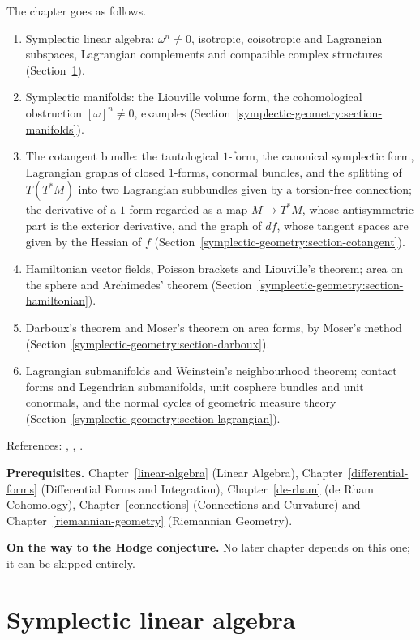 The chapter goes as follows.
\begin{enumerate}
\item Symplectic linear algebra: $\omega^n \neq 0$, isotropic, coisotropic and Lagrangian subspaces, Lagrangian complements and compatible complex structures
(Section~\ref{symplectic-geometry:section-linear}).
\item Symplectic manifolds: the Liouville volume form, the cohomological obstruction $[\omega]^n \neq 0$, examples (Section~\ref{symplectic-geometry:section-manifolds}).
\item The cotangent bundle: the tautological $1$-form, the canonical symplectic form, Lagrangian graphs of closed $1$-forms, conormal bundles, and the splitting of $T(T^*M)$ into two Lagrangian
subbundles given by a torsion-free connection; the derivative of a $1$-form regarded as a map $M \to T^*M$, whose antisymmetric part is the exterior derivative, and the graph of $df$, whose
tangent spaces are given by the Hessian of $f$ (Section~\ref{symplectic-geometry:section-cotangent}).
\item Hamiltonian vector fields, Poisson brackets and Liouville's theorem; area on the sphere and Archimedes' theorem (Section~\ref{symplectic-geometry:section-hamiltonian}).
\item Darboux's theorem and Moser's theorem on area forms, by Moser's method (Section~\ref{symplectic-geometry:section-darboux}).
\item Lagrangian submanifolds and Weinstein's neighbourhood theorem; contact forms and Legendrian submanifolds, unit cosphere bundles and unit conormals, and the normal cycles
of geometric measure theory (Section~\ref{symplectic-geometry:section-lagrangian}).
\end{enumerate}
References: \cite{cannas-da-silva}, \cite{mcduff-salamon}, \cite[Chapter 22]{lee-smooth-manifolds}.

\noindent\textbf{Prerequisites.} Chapter~\ref{linear-algebra} (Linear Algebra), Chapter~\ref{differential-forms} (Differential Forms and Integration), Chapter~\ref{de-rham} (de Rham Cohomology),
Chapter~\ref{connections} (Connections and Curvature) and Chapter~\ref{riemannian-geometry} (Riemannian Geometry).

\noindent\textbf{On the way to the Hodge conjecture.} No later chapter depends on this one; it can be skipped entirely.

\section{Symplectic linear algebra}\label{symplectic-geometry:section-linear}

